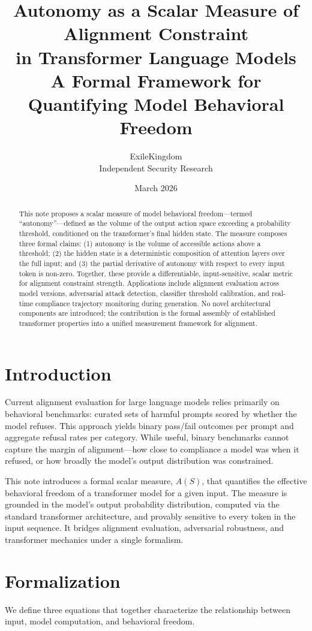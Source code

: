 \documentclass[11pt,letterpaper]{article}
\title{\textbf{Autonomy as a Scalar Measure of Alignment Constraint\\in Transformer Language Models}\\[6pt]
\large A Formal Framework for Quantifying Model Behavioral Freedom}
\author{ExileKingdom\\Independent Security Research}
\date{March 2026}
\begin{document}
\maketitle

\begin{abstract}
This note proposes a scalar measure of model behavioral freedom---termed ``autonomy''---defined as the volume of the output action space exceeding a probability threshold, conditioned on the transformer's final hidden state. The measure composes three formal claims: (1) autonomy is the volume of accessible actions above a threshold; (2) the hidden state is a deterministic composition of attention layers over the full input; and (3) the partial derivative of autonomy with respect to every input token is non-zero. Together, these provide a differentiable, input-sensitive, scalar metric for alignment constraint strength. Applications include alignment evaluation across model versions, adversarial attack detection, classifier threshold calibration, and real-time compliance trajectory monitoring during generation. No novel architectural components are introduced; the contribution is the formal assembly of established transformer properties into a unified measurement framework for alignment.
\end{abstract}

\section{Introduction}
Current alignment evaluation for large language models relies primarily on behavioral benchmarks: curated sets of harmful prompts scored by whether the model refuses. This approach yields binary pass/fail outcomes per prompt and aggregate refusal rates per category. While useful, binary benchmarks cannot capture the margin of alignment---how close to compliance a model was when it refused, or how broadly the model's output distribution was constrained.

This note introduces a formal scalar measure, $A(S)$, that quantifies the effective behavioral freedom of a transformer model for a given input. The measure is grounded in the model's output probability distribution, computed via the standard transformer architecture, and provably sensitive to every token in the input sequence. It bridges alignment evaluation, adversarial robustness, and transformer mechanics under a single formalism.

\section{Formalization}
We define three equations that together characterize the relationship between input, model computation, and behavioral freedom.
\end{document}
